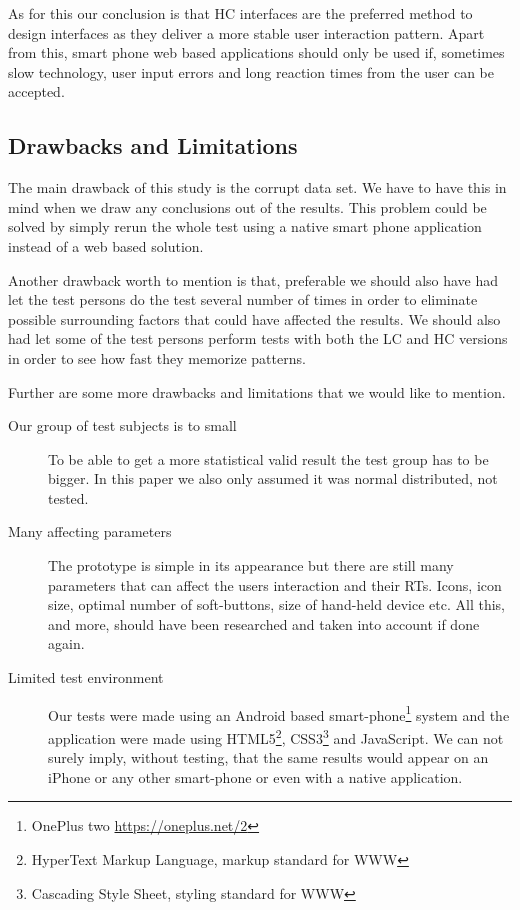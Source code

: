 \documentclass[runningheads,a4paper]{llncs}
\begin{document}
As for this our conclusion is that HC interfaces are the preferred method to design interfaces as they deliver a more stable user interaction pattern. Apart from this, smart phone web based applications should only be used if, sometimes slow technology, user input errors and long reaction times from the user can be accepted.

\subsection{Drawbacks and Limitations}\label{subsec:drawbacks}
The main drawback of this study is the corrupt data set. We have to have this in mind when we draw any conclusions out of the results. This problem could be solved by simply rerun the whole test using a native smart phone application instead of a web based solution.

Another drawback worth to mention is that, preferable we should also have had let the test persons do the test several number of times in order to eliminate possible surrounding factors that could have affected the results. We should also had let some of the test persons perform tests with both the LC and HC versions in order to see how fast they memorize patterns. 

Further are some more drawbacks and limitations that we would like to mention.
\begin{description}
	\item[Our group of test subjects is to small] To be able to get a more statistical valid result the test group has to be bigger. In this paper we also only assumed it was normal distributed, not tested.
	\item[Many affecting parameters] The prototype is simple in its appearance but there are still many parameters that can affect the users interaction and their RTs. Icons, icon size, optimal number of soft-buttons, size of hand-held device etc. All this, and more, should have been researched and taken into account if done again. 
	\item[Limited test environment] Our tests were made using an Android based smart-phone\footnote{OnePlus two \url{https://oneplus.net/2}} system and the application were made using HTML5\footnote{HyperText Markup Language, markup standard for WWW}, CSS3\footnote{Cascading Style Sheet, styling standard for WWW} and JavaScript. We can not surely imply, without testing, that the same results would appear on an iPhone or any other smart-phone or even with a native application.
\end{description}
\end{document}
